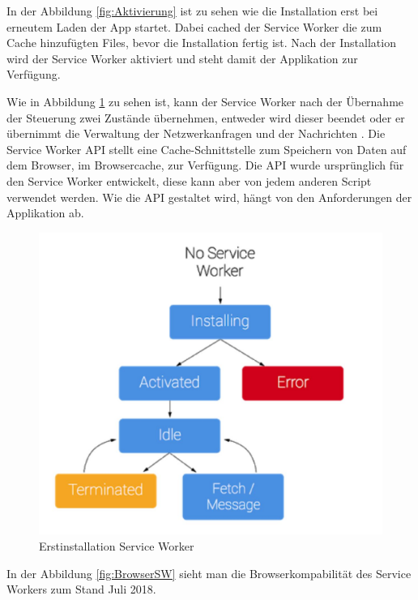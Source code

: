 In der Abbildung \ref{fig:Aktivierung} ist zu sehen wie die Installation erst bei erneutem Laden der App startet. Dabei cached der Service Worker die zum Cache hinzufügten Files, bevor die Installation fertig ist.
Nach der Installation wird der Service Worker aktiviert und steht damit der Applikation zur Verfügung.


Wie in Abbildung \ref{fig:Erstinstallation} zu sehen ist, kann der Service Worker nach der Übernahme der Steuerung zwei Zustände übernehmen, entweder wird dieser beendet oder er übernimmt die Verwaltung der Netzwerkanfragen und der Nachrichten \cite{ServiceWorkerRegistration}.
Die Service Worker API stellt eine Cache-Schnittstelle zum Speichern von Daten auf dem Browser, im Browsercache, zur Verfügung. Die API wurde ursprünglich für den Service Worker entwickelt, diese kann aber von jedem anderen Script verwendet werden. 
Wie die API gestaltet wird, hängt von den Anforderungen der Applikation ab.


\begin{figure}[H]
	\centering
	\includegraphics[width=12cm]{BilderAllgemein/InstallSW}\medskip
	\caption{Erstinstallation Service Worker \cite{ServiceWorkerRegistration}}
	\label{fig:Erstinstallation}
\end{figure}


In der Abbildung \ref{fig:BrowserSW} sieht man die Browserkompabilität des Service Workers zum Stand Juli 2018.




